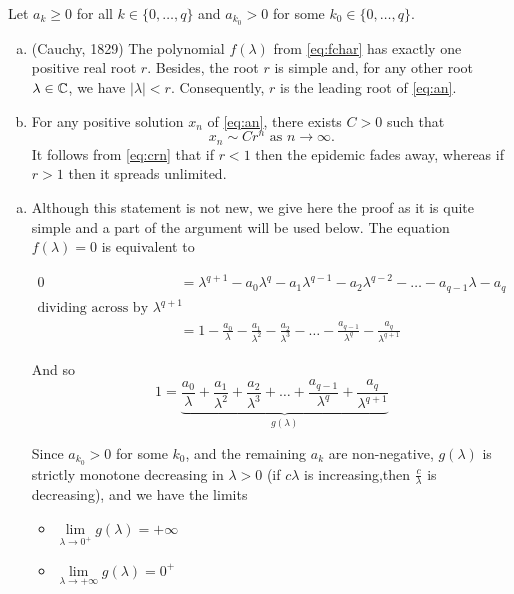 \begin{theorem}\label{thm:lim}
Let $a_k \geq 0$ for all $k \in \{0,\dots,q\}$ and $a_{k_0} > 0$ for some $k_0\in \{0,\dots,q\}$.
\begin{enumerate}[(a)]
    \item (Cauchy, 1829) The polynomial $f(\lambda)$ from \ref{eq:fchar} has exactly one positive real root $r$. Besides, the root $r$ is simple and, for any other root $\lambda \in \mathbb C$, we have $|\lambda| < r$. Consequently, $r$ is the leading root of \ref{eq:an}.
    \item For any positive solution $x_n$ of \ref{eq:an}, there exists $C > 0$ such that
    \begin{equation}\label{eq:crn}
        x_n \sim Cr^n \text{ as } n\to\infty.
    \end{equation}
    It follows from \ref{eq:crn} that if $r < 1$ then the epidemic fades away, whereas if $r > 1$ then it spreads unlimited.
\end{enumerate}
\begin{pf}
\begin{enumerate}[(a)]
\item Although this statement is not new, we give here the proof as it is quite simple and a part of the argument will be used below. The equation $f(\lambda) = 0$ is equivalent to

$\begin{aligned}
0 &= \lambda^{q+1} - a_0\lambda^q - a_1\lambda^{q-1} - a_2\lambda^{q-2} - \dots - a_{q-1}\lambda - a_q \\
\text{dividing across by } \lambda^{q+1} \\
  &= 1 - \frac{a_0}{\lambda} - \frac{a_1}{\lambda^2} - \frac{a_2}{\lambda^3}-\dots - \frac{a_{q-1}}{\lambda^q} -\frac{a_q}{\lambda^{q+1}}
\end{aligned}$
    
And so
\begin{equation} \label{eq:glambda}
1 =\underbrace{\frac{a_0}{\lambda} + \frac{a_1}{\lambda^2} + \frac{a_2}{\lambda^3}+\dots + \frac{a_{q-1}}{\lambda^q} +\frac{a_q}{\lambda^{q+1}}}_{g(\lambda)}    
\end{equation}

Since $a_{k_0} > 0$ for some $k_0$, and the remaining $a_k$ are non-negative, $g(\lambda)$ is strictly monotone decreasing in $\lambda > 0$ (if $c\lambda$ is increasing,then $\frac{c}\lambda$ is decreasing),  and we have the limits
\begin{itemize}
    \item $\lim\limits_{\lambda\to0^+}g(\lambda)=+\infty$
    \item $\lim\limits_{\lambda\to+\infty}g(\lambda)=0^+$
\end{itemize}


\end{enumerate}
\end{pf}
\end{theorem}
